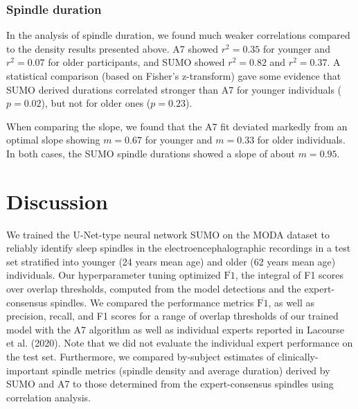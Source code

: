 \documentclass[fleqn,twocolumn,10pt]{wlscirep}
\newcommand{\Fmean}{$\overline{\text{F1}}$}
\begin{document}
\subsubsection{Spindle duration}

In the analysis of spindle duration, we found much weaker correlations compared
to the density results presented above.  A7 showed $r^2=0.35$ for younger and
$r^2=0.07$ for older participants, and SUMO showed $r^2=0.82$ and $r^2=0.37$.
A statistical comparison (based on Fisher's z-transform) gave some evidence that
SUMO derived durations correlated stronger than A7 for younger individuals
($p=0.02$), but not for older ones ($p=0.23$).

When comparing the slope, we found that the A7 fit deviated markedly from an
optimal slope showing $m=0.67$ for younger and $m=0.33$ for older individuals.
In both cases, the SUMO spindle durations showed a slope of about $m=0.95$.

 
\section{Discussion}
\label{sec:discussion}

We trained the U-Net-type neural network SUMO on the MODA dataset to reliably
identify sleep spindles in the electroencephalographic recordings in a test set
stratified into younger (24 years mean age) and older (62 years mean age)
individuals.
Our hyperparameter tuning optimized \Fmean{}, the integral of F1 scores over
overlap thresholds, computed from the model detections and the
expert-consensus spindles.
We compared the performance metrics \Fmean{}, as well as precision, recall, and
F1 scores for a range of overlap thresholds of our trained model with the A7
algorithm as well as individual experts reported in Lacourse et
al. (2020)\cite{Lacourse2020}.
Note that we did not evaluate the individual expert performance on the test set.
Furthermore, we compared by-subject estimates of clinically-important spindle
metrics (spindle density and average duration) derived by SUMO and A7 to
those determined from the expert-consensus spindles using correlation analysis.
\end{document}
